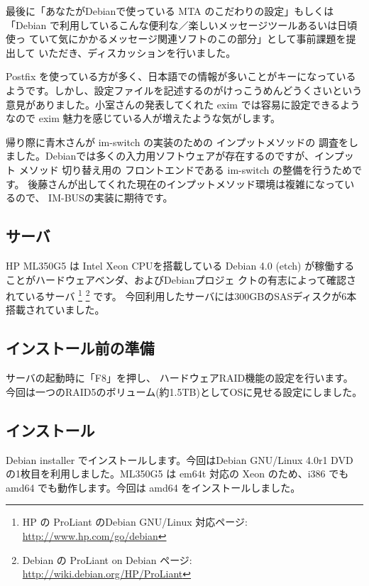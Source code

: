 \documentclass[mingoth,a4paper]{jsarticle}
\begin{document}
最後に「あなたがDebianで使っている MTA のこだわりの設定」もしくは
「Debian で利用しているこんな便利な／楽しいメッセージツールあるいは日頃使っ
ていて気にかかるメッセージ関連ソフトのこの部分」として事前課題を提出して
いただき、ディスカッションを行いました。

Postfix を使っている方が多く、日本語での情報が多いことがキーになっている
ようです。しかし、設定ファイルを記述するのがけっこうめんどうくさいという
意見がありました。小室さんの発表してくれた exim では容易に設定できるよう
なので exim 魅力を感じている人が増えたような気がします。

帰り際に青木さんが im-switch の実装のための インプットメソッドの 調査をし
ました。Debianでは多くの入力用ソフトウェアが存在するのですが、インプット
メソッド 切り替え用の フロントエンドである im-switch の整備を行うためです。
後藤さんが出してくれた現在のインプットメソッド環境は複雑になっているので、
IM-BUSの実装に期待です。

\label{ml350g5}

\subsection{サーバ}

HP ML350G5 は Intel Xeon CPUを搭載している
Debian 4.0 (etch) が稼働することがハードウェアベンダ、およびDebianプロジェ
クトの有志によって確認されているサーバ
\footnote{HP の ProLiant のDebian GNU/Linux 対応ページ:
\url{http://www.hp.com/go/debian}}
\footnote{Debian の ProLiant on Debian ページ:
\url{http://wiki.debian.org/HP/ProLiant}}
です。
今回利用したサーバには300GBのSASディスクが6本搭載されていました。

\subsection{インストール前の準備}

サーバの起動時に「F8」を押し、
ハードウェアRAID機能の設定を行います。
今回は一つのRAID5のボリューム(約1.5TB)としてOSに見せる設定にしました。

\subsection{インストール}

Debian installer でインストールします。今回はDebian GNU/Linux 4.0r1 DVD 
の1枚目を利用しました。ML350G5 は em64t 対応の Xeon のため、i386 でも 
amd64 でも動作します。今回は amd64 をインストールしました。
\end{document}
